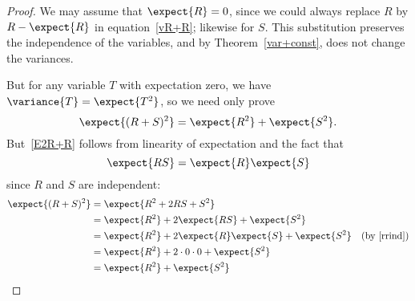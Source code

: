 \begin{proof}
We may assume that $\expect{R} = 0$, since we could always replace $R$
by $R-\expect{R}$ in equation~\eqref{vR+R}; likewise for $S$.  This
substitution preserves the independence of the variables, and by
Theorem~\ref{var+const}, does not change the variances.

But for any variable $T$ with expectation zero, we have $\variance{T}
= \expect{T^2}$, so we need only prove
\begin{equation}\label{E2R+R}
\expect{(R+S)^2} = \expect{R^2} + \expect{S^2}.
\end{equation}
But~\eqref{E2R+R} follows from linearity of expectation and the fact that
\begin{equation}\label{rrind}
\expect{RS} = \expect{R}\expect{S}
\end{equation}
since $R$ and $S$ are independent:
\begin{align*}
\expect{(R+S)^2}
   & = \expect{R^2+2RS +S^2}\\
   & = \expect{R^2}+2\expect{RS} +\expect{S^2}\\
   & = \expect{R^2}+2\expect{R}\expect{S} +\expect{S^2}
             & \text{(by~\eqref{rrind})}\\
   & = \expect{R^2}+2\cdot 0 \cdot 0 +\expect{S^2}\\
   & =  \expect{R^2} + \expect{S^2}
\end{align*}

\iffalse
We will transform the left side into the right side.  We begin by
applying the alternate definition of variance.
\[
\variance{R + S} = \expect{(R + S)^2} - \expectsq{R + S}.
\]

We will work on the first term and then the second term separately.
For the first term, note\begin{eqnarray*}
\expect{(R+S)^2}
& = &   \expect{R^2 + 2 R S + S^2} \\
& = &   \expect{R^2} + \expect{2 R S} + \expect{S^2} \\
& = &   \expect{R^2} + 2 \expect{R} \expect{S} + \expect{S^2}.
\end{eqnarray*}
First, we multiply out the squared expression.  The second step uses
linearity of expectation.  In the last step, we break the
expectation of the product $R S$ into a product of expectations;
this is where we use the fact that $R$ and $S$ are independent.
Now we work on the second term.
\begin{eqnarray*}
\expectsq{R+S} & = & (\expect{R} + \expect{S})^2 \\
& = & \expectsq{R} + 2 \expect{R} \expect{S} + \expectsq{S}.
n\end{eqnarray*}
The first step uses linearity of expectation, and in the second step
we multiply out the squared expression.  Now we subtract the
(expanded) second term from the first. Cancelling and rearranging
terms, we find that
\begin{eqnarray*}
\variance{R + S} & = &   (\expect{R^2} - \expectsq{R}) +
(\expect{S^2}) - \expectsq{S}) \\
& = &   \variance{R} + \variance{S}.
\end{eqnarray*}
\fi
\end{proof}

